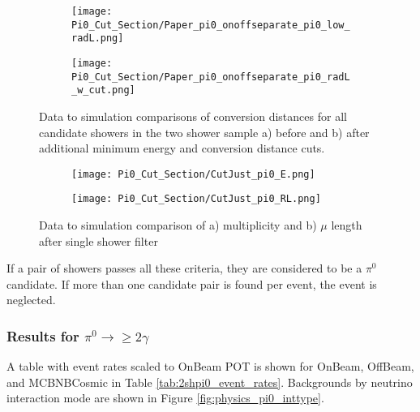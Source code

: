  
\begin{figure}[t!]
\centering
  \begin{subfigure}[t]{0.4\textwidth}
    \centering
\texttt{[image: Pi0\_Cut\_Section/Paper\_pi0\_onoffseparate\_pi0\_low\_radL.png]}
  \caption{ }
  \end{subfigure} 
  \hspace{20mm}
  \begin{subfigure}[t]{0.4\textwidth}
    \centering
\texttt{[image: Pi0\_Cut\_Section/Paper\_pi0\_onoffseparate\_pi0\_radL\_w\_cut.png]}
  \caption{ }
  \end{subfigure} 
\caption{ Data to simulation comparisons of conversion distances for all candidate showers in the two shower sample a) before and b) after additional minimum energy and conversion distance cuts. }
\label{fig:physics_radl_before_after}
\end{figure}


\begin{figure}[t!]
\centering
  \begin{subfigure}[t]{0.4\textwidth}
    \centering
\texttt{[image: Pi0\_Cut\_Section/CutJust\_pi0\_E.png]}
  \caption{ }
  \end{subfigure} 
  \hspace{20mm}
  \begin{subfigure}[t]{0.4\textwidth}
    \centering
\texttt{[image: Pi0\_Cut\_Section/CutJust\_pi0\_RL.png]}
  \caption{ }
  \end{subfigure} 
\caption{ Data to simulation comparison of a) multiplicity and b) $\mu$ length after single shower filter }
\label{fig:cutjust_pi0_e}
\end{figure}

\par If a pair of showers passes all these criteria, they are considered to be a $\pi^0$ candidate. If more than one candidate pair is found per event, the event is neglected.

\clearpage
\subsubsection{Results for $\pi^0\rightarrow \geq 2 \gamma$}
\par A table with event rates scaled to OnBeam POT is shown for OnBeam, OffBeam, and MCBNBCosmic in Table \ref{tab:2shpi0_event_rates}. Backgrounds by neutrino interaction mode are shown in Figure \ref{fig:physics_pi0_inttype}. 

